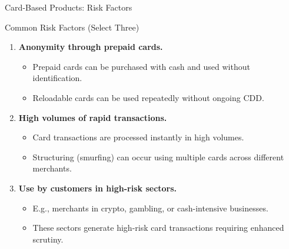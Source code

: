 \documentclass{beamer}
\begin{document}
	\begin{frame}{Card-Based Products: Risk Factors}
		\begin{block}{Common Risk Factors (Select Three)}
			\begin{enumerate}
				\item \textbf{Anonymity through prepaid cards.}
				\begin{itemize}
					\item Prepaid cards can be purchased with cash and used without identification.
					\item Reloadable cards can be used repeatedly without ongoing CDD.
				\end{itemize}
				\item \textbf{High volumes of rapid transactions.}
				\begin{itemize}
					\item Card transactions are processed instantly in high volumes.
					\item Structuring (smurfing) can occur using multiple cards across different merchants.
				\end{itemize}
				\item \textbf{Use by customers in high-risk sectors.}
				\begin{itemize}
					\item E.g., merchants in crypto, gambling, or cash-intensive businesses.
					\item These sectors generate high-risk card transactions requiring enhanced scrutiny.
				\end{itemize}
			\end{enumerate}
		\end{block}
	\end{frame}
	
\end{document}
